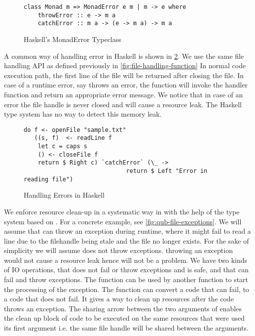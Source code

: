 \begin{figure}[h]
  \begin{framed}
\begin{verbatim}
class Monad m => MonadError e m | m -> e where
    throwError :: e -> m a
    catchError :: m a -> (e -> m a) -> m a
\end{verbatim}
  \end{framed}
  \caption{Haskell's MonadError Typeclass}
  \label{fig:haskell-monaderror}
\end{figure}

\noindent
A common way of handling error in Haskell is shown in \cref{fig:haskell-error-handling}.
We use the same file handling API as defined previously in \cref{fig:file-handling-function}
In normal code execution path, the first line of the file will be returned after closing the file.
In case of a runtime error, say  throws an error, the  function will
invoke the handler function and return an appropriate error message. We notice that in case of an error the file handle 
is never closed and will cause a resource leak. The Haskell type system has no way to detect this memory leak.

\begin{figure}[h]
  \begin{framed}
\begin{verbatim}
do f <- openFile "sample.txt"
   ((s, f)  <- readLine f
    let c = caps s
    () <- closeFile f
    return $ Right c) `catchError` (\_ ->
                             return $ Left "Error in reading file")
\end{verbatim}
  \end{framed}
  \caption{Handling Errors in Haskell}
  \label{fig:haskell-error-handling}
\end{figure}

We enforce resource clean-up in a systematic way in \qub{} with the help of the type system based on \BI{}.
For a concrete example, see \cref{fig:qub-file-exceptions}.
We will assume that  can throw an exception during runtime, where
it might fail to read a line due to the filehandle being stale and the file no longer exists.
For the sake of simplicity we will assume 
does not throw exceptions.  throwing an exception would not cause a resource leak hence will not be a problem.
We have two kinds of IO operations,  that does not fail or throw exceptions and is safe,
and  that can fail and throw exceptions. The function  can be used by another function to start
the processing of the exception. The function  can convert a code that can fail, to a code
that does not fail. It gives a way to clean up resources after the code throws an exception.
The sharing arrow between the two arguments of  enables the clean up block of code to be executed on the same resources
that were used its first argument i.e. the same file handle will be shared between the arguments.

